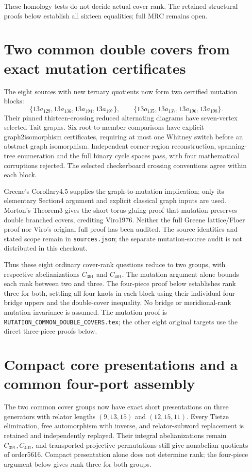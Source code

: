 \documentclass[11pt]{article}
\begin{document}
These homology tests do not decide actual cover rank. The retained
structural proofs below establish all sixteen equalities; full MRC
remains open.

\section{Two common double covers from exact mutation certificates}

The eight sources with new ternary quotients now form two certified
mutation blocks:
\[
 \{13a_{129},13a_{136},13a_{194},13a_{197}\},\qquad
 \{13a_{135},13a_{137},13a_{196},13a_{198}\}.
\]
Their pinned thirteen-crossing reduced alternating diagrams have
seven-vertex selected Tait graphs. Six root-to-member comparisons have
explicit graph2isomorphism certificates, requiring at most one Whitney
switch before an abstract graph isomorphism. Independent corner-region
reconstruction, spanning-tree enumeration and the full binary cycle
spaces pass, with four mathematical corruptions rejected. The selected
checkerboard crossing conventions agree within each block.

Greene's Corollary4.5 supplies the graph-to-mutation implication;
only its elementary Section4 argument and explicit classical graph
inputs are used. Morton's Theorem3 gives the short torus-gluing proof
that mutation preserves double branched covers, crediting Viro1976.
Neither the full Greene lattice/Floer proof nor Viro's original full proof
has been audited. The source identities and stated scope remain in
\texttt{sources.json}; the separate mutation-source audit is not
distributed in this checkout.

Thus these eight ordinary cover-rank questions reduce to two groups,
with respective abelianizations $C_{391}$ and $C_{401}$. The mutation
argument alone bounds each rank between two and three. The four-piece
proof below establishes rank three for both, settling all four knots in
each block using their individual four-bridge uppers and the double-cover
inequality. No bridge or meridional-rank mutation invariance is assumed.
The mutation proof is
\texttt{MUTATION\_COMMON\_DOUBLE\_COVERS.tex}; the other eight original
targets use the direct three-piece proofs below.

\section{Compact core presentations and a common four-port assembly}

The two common cover groups now have exact short presentations on three
generators with relator lengths $(9,13,15)$ and $(12,15,11)$. Every
Tietze elimination, free automorphism with inverse, and relator-subword
replacement is retained and independently replayed. Their integral
abelianizations remain $C_{391},C_{401}$, and transported projective
permutations still give nonabelian quotients of order5616. Compact
presentation alone does not determine rank; the four-piece argument below
gives rank three for both groups.
\end{document}
